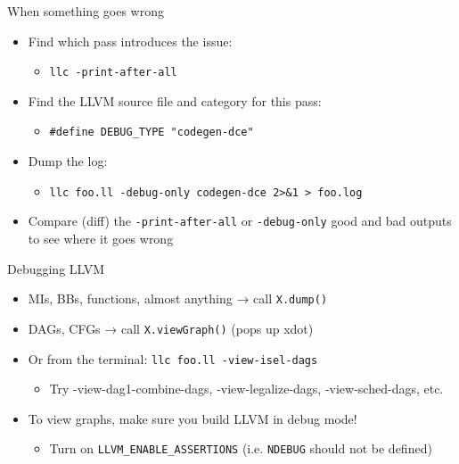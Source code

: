 
\begin{frame}{When something goes wrong}

\begin{itemize}
    \item Find which pass introduces the issue:
    \begin{itemize}
        \item \texttt{llc -print-after-all}
    \end{itemize}
    \item Find the LLVM source file and category for this pass:
    \begin{itemize}
        \item \texttt{\#define DEBUG\_TYPE "codegen-dce"}
    \end{itemize}
    \item Dump the log:
    \begin{itemize}
        \item \texttt{llc foo.ll -debug-only codegen-dce 2>\&1 > foo.log}
    \end{itemize}
    \item Compare (diff) the \texttt{-print-after-all} or \texttt{-debug-only} good and bad outputs to see where it goes wrong
\end{itemize}

\end{frame}


\begin{frame}{Debugging LLVM}

\begin{itemize}
    \item MIs, BBs, functions, almost anything → call \texttt{X.dump()}
    \item DAGs, CFGs → call \texttt{X.viewGraph()} (pops up xdot)
    \item Or from the terminal: \texttt{llc foo.ll -view-isel-dags}
    \begin{itemize}
        \item Try -view-dag1-combine-dags, -view-legalize-dags, -view-sched-dags, etc.
    \end{itemize}
    \item To view graphs, make sure you build LLVM in debug mode!
    \begin{itemize}
        \item Turn on \texttt{LLVM\_ENABLE\_ASSERTIONS} (i.e. \texttt{NDEBUG} should not be defined)
    \end{itemize}
\end{itemize}

\end{frame}

